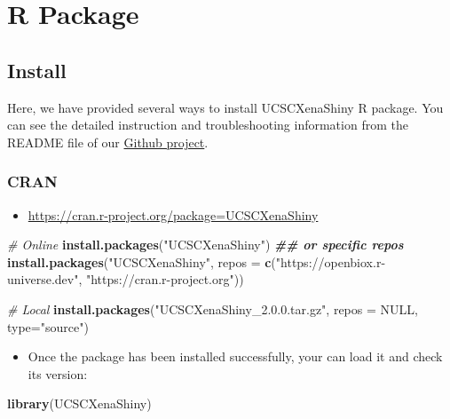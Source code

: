 \documentclass[
]{book}
\newenvironment{Shaded}{\begin{snugshade}}{\end{snugshade}}
\newcommand{\AttributeTok}[1]{\textcolor[rgb]{0.13,0.29,0.53}{#1}}
\newcommand{\CommentTok}[1]{\textcolor[rgb]{0.56,0.35,0.01}{\textit{#1}}}
\newcommand{\ConstantTok}[1]{\textcolor[rgb]{0.56,0.35,0.01}{#1}}
\newcommand{\DocumentationTok}[1]{\textcolor[rgb]{0.56,0.35,0.01}{\textbf{\textit{#1}}}}
\newcommand{\FunctionTok}[1]{\textcolor[rgb]{0.13,0.29,0.53}{\textbf{#1}}}
\newcommand{\NormalTok}[1]{#1}
\newcommand{\StringTok}[1]{\textcolor[rgb]{0.31,0.60,0.02}{#1}}
\providecommand{\tightlist}{%
  \setlength{\itemsep}{0pt}\setlength{\parskip}{0pt}}
\begin{document}
\part{R Package}\label{part-r-package}

\chapter{Install}\label{install}

Here, we have provided several ways to install UCSCXenaShiny R package. You can see the detailed instruction and troubleshooting information from the README file of our \href{https://github.com/openbiox/UCSCXenaShiny}{Github project}.

\section{CRAN}\label{cran}

\begin{itemize}
\tightlist
\item
  \url{https://cran.r-project.org/package=UCSCXenaShiny}
\end{itemize}

\begin{Shaded}
\begin{Highlighting}[]
\CommentTok{\# Online}
\FunctionTok{install.packages}\NormalTok{(}\StringTok{"UCSCXenaShiny"}\NormalTok{)}
\DocumentationTok{\#\# or specific repos}
\FunctionTok{install.packages}\NormalTok{(}\StringTok{"UCSCXenaShiny"}\NormalTok{, }\AttributeTok{repos =} \FunctionTok{c}\NormalTok{(}\StringTok{"https://openbiox.r{-}universe.dev"}\NormalTok{, }\StringTok{"https://cran.r{-}project.org"}\NormalTok{))}

\CommentTok{\# Local}
\FunctionTok{install.packages}\NormalTok{(}\StringTok{"UCSCXenaShiny\_2.0.0.tar.gz"}\NormalTok{, }\AttributeTok{repos =} \ConstantTok{NULL}\NormalTok{, }\AttributeTok{type=}\StringTok{"source"}\NormalTok{)}
\end{Highlighting}
\end{Shaded}

\begin{itemize}
\tightlist
\item
  Once the package has been installed successfully, your can load it and check its version:
\end{itemize}

\begin{Shaded}
\begin{Highlighting}[]
\FunctionTok{library}\NormalTok{(UCSCXenaShiny)}
\end{Highlighting}
\end{Shaded}
\end{document}
